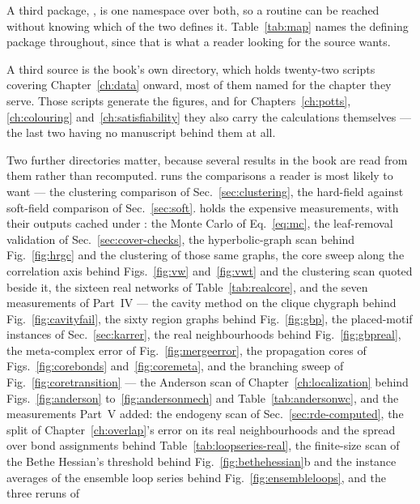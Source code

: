 A third package, , is one namespace over both, so a routine can
be reached without knowing which of the two defines it. Table~\ref{tab:map}
names the defining package throughout, since that is what a reader looking for
the source wants.

A third source is the book's own  directory, which holds
twenty-two scripts covering Chapter~\ref{ch:data} onward, most of them named
for the chapter they serve. Those scripts generate the figures, and for
Chapters~\ref{ch:potts}, \ref{ch:colouring} and~\ref{ch:satisfiability} they
also carry the calculations themselves --- the last two having no manuscript
behind them at all.

Two further directories matter, because several results in the book are read
from them rather than recomputed. 
runs the comparisons a reader is most likely to want --- the clustering
comparison of Sec.~\ref{sec:clustering}, the hard-field against soft-field
comparison of Sec.~\ref{sec:soft}.  holds the
expensive measurements, with their outputs cached under
: the Monte
Carlo of Eq.~\eqref{eq:mc}, the leaf-removal validation of
Sec.~\ref{sec:cover-checks}, the hyperbolic-graph scan behind
Fig.~\ref{fig:hrgc} and the clustering of those same graphs, the core sweep
along the correlation axis behind Figs.~\ref{fig:vw} and~\ref{fig:vwt} and the
clustering scan quoted beside it, the sixteen real networks of
Table~\ref{tab:realcore}, and the seven measurements of Part~IV --- the cavity method on
the clique chygraph behind Fig.~\ref{fig:cavityfail}, the sixty region graphs
behind Fig.~\ref{fig:gbp}, the placed-motif instances of
Sec.~\ref{sec:karrer}, the real neighbourhoods behind Fig.~\ref{fig:gbpreal},
the meta-complex error of Fig.~\ref{fig:mergeerror}, the propagation cores of
Figs.~\ref{fig:corebonds} and~\ref{fig:coremeta}, and the branching sweep of
Fig.~\ref{fig:coretransition} --- the Anderson scan of
Chapter~\ref{ch:localization} behind Figs.~\ref{fig:anderson}
to~\ref{fig:andersonmech} and Table~\ref{tab:andersonwc}, and the
measurements Part~V added: the endogeny scan of Sec.~\ref{sec:rde-computed},
the split of Chapter~\ref{ch:overlap}'s error on its real neighbourhoods and
the spread over bond assignments behind Table~\ref{tab:loopseries-real},
the finite-size scan of the Bethe Hessian's threshold behind
Fig.~\ref{fig:bethehessian}b and the instance averages of the ensemble
loop series behind Fig.~\ref{fig:ensembleloops}, and the three reruns of
